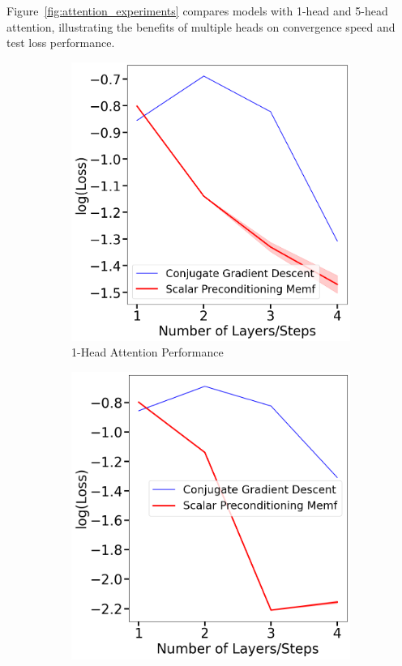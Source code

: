 \documentclass[11pt]{article}
\numberwithin{equation}{section}
\begin{document}
Figure~\ref{fig:attention_experiments} compares models with 1-head and 5-head attention, illustrating the benefits of multiple heads on convergence speed and test loss performance.
\begin{figure}[htbp]
  \centering
  \begin{subfigure}[b]{0.45\textwidth}
    \centering
    \includegraphics[width=\textwidth]{1head_attention_experiment.png}
    \caption{1-Head Attention Performance}
    \label{fig:1head_attention}
  \end{subfigure}
  \hfill
  \begin{subfigure}[b]{0.45\textwidth}
    \centering
    \includegraphics[width=\textwidth]{5head_attention_experiment.png}

\end{subfigure}
\end{figure}
\end{document}
